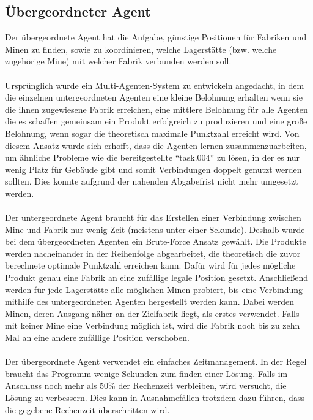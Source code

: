 \subsection{Übergeordneter Agent}
Der übergeordnete Agent hat die Aufgabe, günstige Positionen für Fabriken und Minen zu finden, sowie zu koordinieren, welche Lagerstätte (bzw. welche zugehörige Mine) mit welcher Fabrik verbunden werden soll. 
\\\\
Ursprünglich wurde  ein Multi-Agenten-System zu entwickeln angedacht, in dem die einzelnen untergeordneten Agenten eine kleine Belohnung erhalten wenn sie die ihnen zugewiesene Fabrik erreichen, eine mittlere Belohnung für alle Agenten die es schaffen gemeinsam ein Produkt erfolgreich zu produzieren und eine große Belohnung, wenn sogar die theoretisch maximale Punktzahl erreicht wird. Von diesem Ansatz wurde sich erhofft, dass die Agenten lernen zusammenzuarbeiten, um ähnliche Probleme wie die bereitgestellte “task.004” zu lösen, in der es nur wenig Platz für Gebäude gibt und somit Verbindungen doppelt genutzt werden sollten. Dies konnte aufgrund der nahenden Abgabefrist nicht mehr umgesetzt werden.
\\\\
Der untergeordnete Agent braucht für das Erstellen einer Verbindung zwischen Mine und Fabrik nur wenig Zeit (meistens unter einer Sekunde). Deshalb wurde  bei dem übergeordneten Agenten ein Brute-Force Ansatz gewählt. Die Produkte werden nacheinander in der Reihenfolge abgearbeitet, die theoretisch die zuvor berechnete optimale Punktzahl erreichen kann. Dafür wird für jedes mögliche Produkt genau eine Fabrik an eine zufällige legale Position gesetzt. Anschließend werden für jede Lagerstätte alle möglichen Minen probiert, bis eine Verbindung mithilfe des untergeordneten Agenten hergestellt werden kann. Dabei werden Minen, deren Ausgang näher an der Zielfabrik liegt, als erstes verwendet. Falls mit keiner Mine eine Verbindung möglich ist, wird die Fabrik noch bis zu zehn Mal an eine andere zufällige Position verschoben. 
\\\\
Der übergeordnete Agent verwendet ein einfaches Zeitmanagement. In der Regel braucht das Programm wenige Sekunden zum finden einer Lösung. Falls im Anschluss noch mehr als 50\% der Rechenzeit verbleiben, wird versucht, die Lösung zu verbessern. Dies kann in Ausnahmefällen trotzdem dazu führen, dass die gegebene Rechenzeit überschritten wird. 
\\\\
